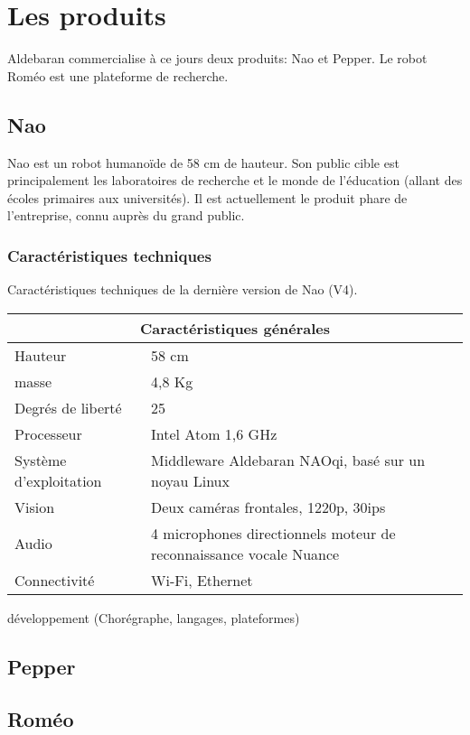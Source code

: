 \section{Les produits}
\label{Entreprise: Les produits}
Aldebaran commercialise à ce jours deux produits: Nao et Pepper. Le robot Roméo est une plateforme de recherche. 

\subsection{Nao}
\label{Entreprise: Les produits: Nao}
Nao est un robot humanoïde de 58 cm de hauteur. Son public cible est principalement les laboratoires de recherche et le monde de l'éducation (allant des écoles primaires aux universités). Il est actuellement le produit phare de l'entreprise, connu auprès du grand public. 

\subsubsection{Caractéristiques techniques}
\label{Entreprise:Les produits: Nao: Caractéristiques techniques}
Caractéristiques techniques de la dernière version de Nao (V4).
\newline 

\begin{tabular}{ | l | p{10cm} | }
\hline
\multicolumn{2}{|c|}{Caractéristiques générales} \\
\hline
Hauteur & 58 cm \\
\hline 
masse & 4,8 Kg \\
\hline 
Degrés de liberté  & 25 \\
\hline
Processeur & Intel Atom 1,6 GHz \\
\hline
Système d'exploitation & Middleware Aldebaran NAOqi, basé sur un noyau Linux \\
\hline 
Vision & Deux caméras frontales, 1220p, 30ips \\
\hline
Audio & 4 microphones directionnels \newline moteur de reconnaissance vocale Nuance  \\
\hline
Connectivité & Wi-Fi, Ethernet \\
\hline
\end{tabular}

\newline
développement (Chorégraphe, langages, plateformes)

\subsection{Pepper}
\label{Entreprise: Les produits: Pepper}

\subsection{Roméo}
\label{Entreprise: Les produits: Roméo}

